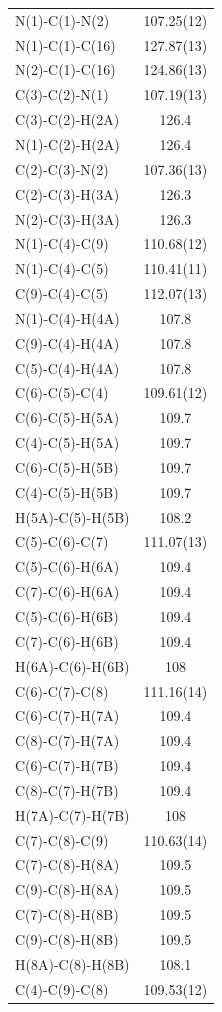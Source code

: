 \begin{center}
{\begin{supertabular}{p{1.5in}c}
N(1)-C(1)-N(2)&107.25(12)\\
N(1)-C(1)-C(16)&127.87(13)\\
N(2)-C(1)-C(16)&124.86(13)\\
C(3)-C(2)-N(1)&107.19(13)\\
C(3)-C(2)-H(2A)&126.4\\
N(1)-C(2)-H(2A)&126.4\\
C(2)-C(3)-N(2)&107.36(13)\\
C(2)-C(3)-H(3A)&126.3\\
N(2)-C(3)-H(3A)&126.3\\
N(1)-C(4)-C(9)&110.68(12)\\
N(1)-C(4)-C(5)&110.41(11)\\
C(9)-C(4)-C(5)&112.07(13)\\
N(1)-C(4)-H(4A)&107.8\\
C(9)-C(4)-H(4A)&107.8\\
C(5)-C(4)-H(4A)&107.8\\
C(6)-C(5)-C(4)&109.61(12)\\
C(6)-C(5)-H(5A)&109.7\\
C(4)-C(5)-H(5A)&109.7\\
C(6)-C(5)-H(5B)&109.7\\
C(4)-C(5)-H(5B)&109.7\\
H(5A)-C(5)-H(5B)&108.2\\
C(5)-C(6)-C(7)&111.07(13)\\
C(5)-C(6)-H(6A)&109.4\\
C(7)-C(6)-H(6A)&109.4\\
C(5)-C(6)-H(6B)&109.4\\
C(7)-C(6)-H(6B)&109.4\\
H(6A)-C(6)-H(6B)&108\\
C(6)-C(7)-C(8)&111.16(14)\\
C(6)-C(7)-H(7A)&109.4\\
C(8)-C(7)-H(7A)&109.4\\
C(6)-C(7)-H(7B)&109.4\\
C(8)-C(7)-H(7B)&109.4\\
H(7A)-C(7)-H(7B)&108\\
C(7)-C(8)-C(9)&110.63(14)\\
C(7)-C(8)-H(8A)&109.5\\
C(9)-C(8)-H(8A)&109.5\\
C(7)-C(8)-H(8B)&109.5\\
C(9)-C(8)-H(8B)&109.5\\
H(8A)-C(8)-H(8B)&108.1\\
C(4)-C(9)-C(8)&109.53(12)\\

\end{supertabular}}
\end{center}
